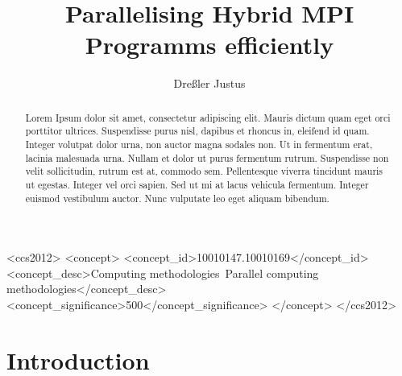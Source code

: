 \documentclass[sigconf]{acmart}
\begin{document}
\title{Parallelising Hybrid MPI Programms efficiently}
\author{Dreßler Justus}


\begin{CCSXML}
    <ccs2012>
    <concept>
    <concept_id>10010147.10010169</concept_id>
    <concept_desc>Computing methodologies~Parallel computing methodologies</concept_desc>
    <concept_significance>500</concept_significance>
    </concept>
    </ccs2012>
\end{CCSXML}


\begin{abstract}

    Lorem Ipsum dolor sit amet, consectetur adipiscing elit.
    Mauris dictum quam eget orci porttitor ultrices.
    Suspendisse purus nisl, dapibus et rhoncus in, eleifend id quam. Integer volutpat dolor urna, non auctor magna sodales non.
    Ut in fermentum erat, lacinia malesuada urna.
    Nullam et dolor ut purus fermentum rutrum.
    Suspendisse non velit sollicitudin, rutrum est at, commodo sem. Pellentesque viverra tincidunt mauris ut egestas.
    Integer vel orci sapien. Sed ut mi at lacus vehicula fermentum.
    Integer euismod vestibulum auctor.
    Nunc vulputate leo eget aliquam bibendum.

\end{abstract}

\maketitle

\section{Introduction}
\end{document}
